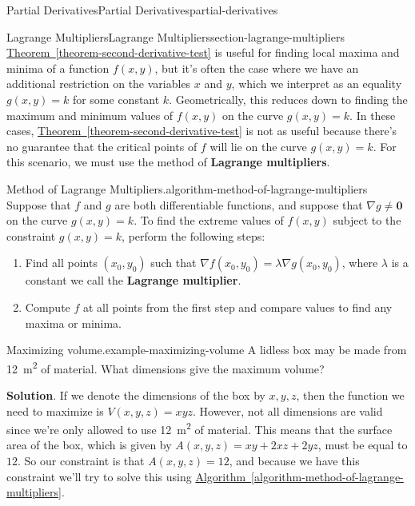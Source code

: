 \documentclass[oneside,10pt,]{book}
\newcommand{\terminology}[1]{\textbf{#1}}
\numberwithin{equation}{section}
\newcommand{\vv}[1]{\mathbf{#1}}
\newcommand{\grad}{\nabla}
\begin{document}
\begin{chapterptx}{Partial Derivatives}{}{Partial Derivatives}{}{}{partial-derivatives}
\typeout{************************************************}
%
\begin{sectionptx}{Lagrange Multipliers}{}{Lagrange Multipliers}{}{}{section-lagrange-multipliers}
\hypertarget{p-1444}{}%
\hyperref[theorem-second-derivative-test]{Theorem~\ref{theorem-second-derivative-test}} is useful for finding local maxima and minima of a function \(f(x,y)\), but it's often the case where we have an additional restriction on the variables \(x\) and \(y\), which we interpret as an equality \(g(x,y) = k\) for some constant \(k\). Geometrically, this reduces down to finding the maximum and minimum values of \(f(x,y)\) on the curve \(g(x,y) = k\). In these cases, \hyperref[theorem-second-derivative-test]{Theorem~\ref{theorem-second-derivative-test}} is not as useful because there's no guarantee that the critical points of \(f\) will lie on the curve \(g(x,y) = k\). For this scenario, we must use the method of \terminology{Lagrange multipliers}.%
\begin{algorithm}{Method of Lagrange Multipliers.}{}{algorithm-method-of-lagrange-multipliers}%
\hypertarget{p-1445}{}%
Suppose that \(f\) and \(g\) are both differentiable functions, and suppose that \(\grad g\neq\vv{0}\) on the curve \(g(x,y) = k\). To find the extreme values of \(f(x,y)\) subject to the constraint \(g(x,y) = k\), perform the following steps:\leavevmode%
\begin{enumerate}
\item\hypertarget{li-141}{}Find all points \((x_{0},y_{0})\) such that \(\grad f(x_{0},y_{0}) = \lambda \grad g(x_{0},y_{0})\), where \(\lambda\) is a constant we call the \terminology{Lagrange multiplier}.%
\item\hypertarget{li-142}{}Compute \(f\) at all points from the first step and compare values to find any maxima or minima.%
\end{enumerate}
%
\end{algorithm}
\begin{example}{Maximizing volume.}{example-maximizing-volume}%
\hypertarget{p-1446}{}%
A lidless box may be made from \SI{12}{\meter\tothe{2}} of material. What dimensions give the maximum volume?%
\par\smallskip%
\noindent\textbf{Solution}.\hypertarget{solution-235}{}\quad%
\hypertarget{p-1447}{}%
If we denote the dimensions of the box by \(x,y,z\), then the function we need to maximize is \(V(x,y,z) = xyz\). However, not all dimensions are valid since we're only allowed to use \SI{12}{\meter\tothe{2}} of material. This means that the surface area of the box, which is given by \(A(x,y,z) = xy + 2xz + 2yz\), must be equal to \(12\). So our constraint is that \(A(x,y,z) = 12\), and because we have this constraint we'll try to solve this using \hyperref[algorithm-method-of-lagrange-multipliers]{Algorithm~\ref{algorithm-method-of-lagrange-multipliers}}.%

\end{example}
\end{sectionptx}
\end{chapterptx}
\end{document}
